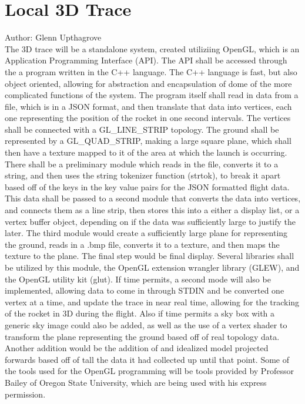 \documentclass[onecolumn, draftclsnofoot,10pt, compsoc]{IEEEtran}
\begin{document}
\section {Local 3D Trace}
Author: Glenn Upthagrove \\
The 3D trace will be a standalone system, created utiliziing OpenGL, which is an Application Programming Interface (API). The API shall be accessed through the a program written in the C++ language. The C++ language is fast, but also object oriented, allowing for abstraction and encapsulation of dome of the more complicated functions of the system. The program itself shall read in data from a file, which is in a JSON format, and then translate that data into vertices, each one representing the position of the rocket in one second intervals. The vertices shall be connected with a GL\_LINE\_STRIP topology. The ground shall be represented by a GL\_QUAD\_STRIP, making a large square plane, which shall then have a texture mapped to it of the area at which the launch is occurring. There shall be a preliminary module which reads in the file, converts it to a string, and then uses the string tokenizer function (strtok), to break it apart based off of the keys in the key value pairs for the JSON formatted flight data. This data shall be passed to a second module that converts the data into vertices, and connects them as a line strip, then stores this into a either a display list, or a vertex buffer object, depending on if the data was sufficiently large to justify the later. The third module would create a sufficiently large plane for representing the ground, reads in a .bmp file, converts it to a texture, and then maps the texture to the plane. The final step would be final display. Several libraries shall be utilized by this module, the OpenGL extension wrangler library (GLEW), and the OpenGL utility kit (glut). \cite{refopengl} \cite{refjson} 
If time permits, a second mode will also be implemented, allowing data to come in through STDIN and be converted one vertex at a time, and update the trace in near real time, allowing for the tracking of the rocket in 3D during the flight. Also if time permits a sky box with a generic sky image could also be added, as well as the use of a vertex shader to transform the plane representing the ground based off of real topology data. Another addition would be the addition of and idealized model projected forwards based off of tall the data it had collected up until that point. Some of the tools used for the OpenGL programming will be tools provided by Professor Bailey of Oregon State University, which are being used with his express permission. 
\end{document}
